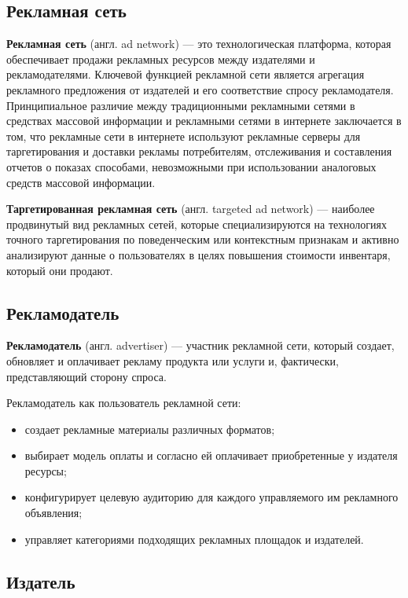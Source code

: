 \documentclass[specification,annotation,times]{itmo-student-thesis}
\begin{document}
\subsection{Рекламная сеть}

\textbf{Рекламная сеть} (англ. ad network)\label{ad-network} — это технологическая платформа, которая обеспечивает продажи рекламных ресурсов между издателями и рекламодателями. Ключевой функцией рекламной сети является агрегация рекламного предложения от издателей и его соответствие спросу рекламодателя. Принципиальное различие между традиционными рекламными сетями в средствах массовой информации и рекламными сетями в интернете заключается в том, что рекламные сети в интернете используют рекламные серверы для таргетирования и доставки рекламы потребителям, отслеживания и составления отчетов о показах способами, невозможными при использовании аналоговых средств массовой информации.

\textbf{Таргетированная рекламная сеть} (англ. targeted ad network) — наиболее продвинутый вид рекламных сетей, которые специализируются на технологиях точного таргетирования по поведенческим или контекстным признакам и активно анализируют данные о пользователях в целях повышения стоимости инвентаря, который они продают.

\subsection{Рекламодатель}

\textbf{Рекламодатель} (англ. advertiser) — участник рекламной сети, который создает, обновляет и оплачивает рекламу продукта или услуги и, фактически, представляющий сторону спроса. 

Рекламодатель как пользователь рекламной сети:
\begin{itemize}
\item создает рекламные материалы различных форматов;
\item выбирает модель оплаты и согласно ей оплачивает приобретенные у издателя ресурсы;
\item конфигурирует целевую аудиторию для каждого управляемого им рекламного объявления;
\item управляет категориями подходящих рекламных площадок и издателей.
\end{itemize}

\subsection{Издатель}
\end{document}

